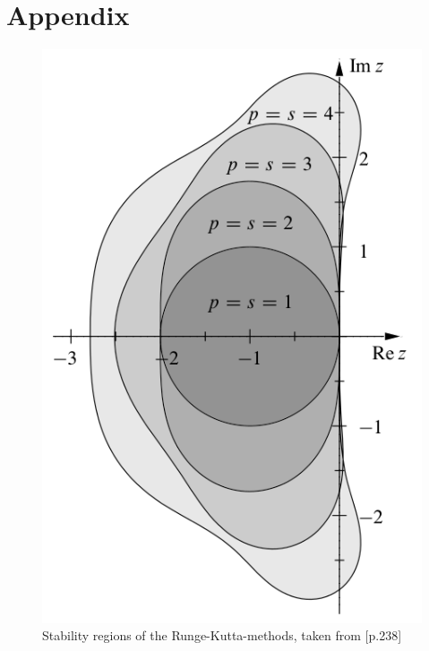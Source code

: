 \documentclass{report}
\begin{document}
\chapter*{Appendix}



\begin{figure}[h]
\centering
\begin{minipage}[b]{0.45\textwidth}
\centering
\includegraphics[width=\textwidth]{../Drawings/Runge_Kutter_stability_regions}
\caption{Stability regions of the Runge-Kutta-methods, taken from \cite{Stab_RK}[p.238]}
\end{minipage}
\end{figure}
\end{document}
